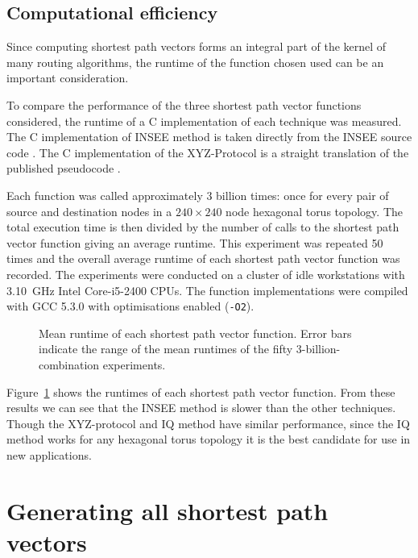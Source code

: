 		\subsection{Computational efficiency}
			
			Since computing shortest path vectors forms an integral part of the
			kernel of many routing algorithms, the runtime of the function chosen
			used can be an important consideration.
			
			To compare the performance of the three shortest path vector functions
			considered, the runtime of a C implementation of each technique was
			measured. The C implementation of INSEE method is taken directly from the
			INSEE source code \cite{navaridas09}. The C implementation of the
			XYZ-Protocol is a straight translation of the published pseudocode
			\cite{hoffmann15}.
			
			Each function was called approximately 3 billion times: once for every
			pair of source and destination nodes in a $240\times240$ node hexagonal
			torus topology. The total execution time is then divided by the number of
			calls to the shortest path vector function giving an average runtime.
			This experiment was repeated 50 times and the overall average runtime of
			each shortest path vector function was recorded. The experiments were
			conducted on a cluster of idle workstations with 3.10~GHz Intel
			Core-i5-2400 CPUs. The function implementations were compiled with GCC
			5.3.0 with optimisations enabled (\verb|-O2|).
			
			\begin{figure}
				\center
				
				\caption{Mean runtime of each shortest path vector function. Error bars
				indicate the range of the mean runtimes of the fifty
				3-billion-combination experiments.}
				\label{fig:shortest-path-vector-runtimes}
			\end{figure}
			
			Figure~\ref{fig:shortest-path-vector-runtimes} shows the runtimes of each
			shortest path vector function. From these results we can see that the
			INSEE method is slower than the other techniques. Though the XYZ-protocol
			and IQ method have similar performance, since the IQ method works for any
			hexagonal torus topology it is the best candidate for use in new
			applications.
	
	\section{Generating all shortest path vectors}
			
